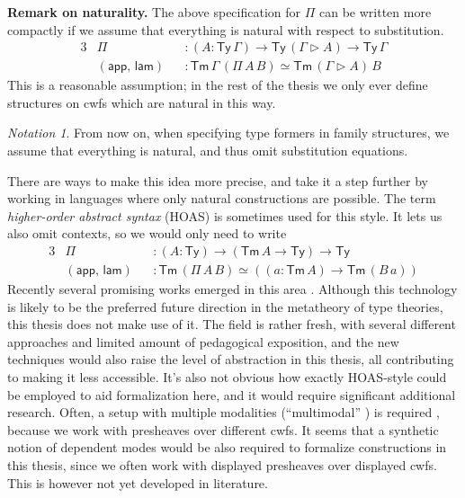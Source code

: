 \documentclass[12pt,a4paper,twoside,openany]{book}
\theoremstyle{remark}
\newtheorem{notation}{Notation}
\theoremstyle{definition}
\theoremstyle{theorem}
\newcommand{\ms}[1]{\mathsf{#1}}
\newcommand{\Tm}{\mathsf{Tm}}
\newcommand{\Ty}{\mathsf{Ty}}
\newcommand{\ext}{\triangleright}
\newcommand{\app}{\ms{app}}
\newcommand{\lam}{\ms{lam}}
\begin{document}
\textbf{Remark on naturality.} The above specification for $\Pi$ can be written
more compactly if we assume that everything is natural with respect to
substitution.
\begin{alignat*}{3}
  &\Pi            &&: (A : \Ty\,\Gamma) \to \Ty\,(\Gamma\ext A) \to \Ty\,\Gamma\\
  & (\app,\,\lam) &&: \Tm\,\Gamma\,(\Pi\,A\,B) \simeq \Tm\,(\Gamma \ext A)\,B
\end{alignat*}
This is a reasonable assumption; in the rest of the thesis we only ever define
structures on cwfs which are natural in this way.

\begin{notation} From now on, when specifying type formers in family structures,
we assume that everything is natural, and thus omit substitution equations.
\end{notation}

There are ways to make this idea more precise, and take it a step further by
working in languages where only natural constructions are possible. The term
\emph{higher-order abstract syntax} (HOAS) is sometimes used for this style. It lets us
also omit contexts, so we would only need to write
\begin{alignat*}{3}
  &\Pi            &&: (A : \Ty) \to (\Tm\,A \to \Ty) \to \Ty\\
  & (\app,\,\lam) &&: \Tm\,(\Pi\,A\,B) \simeq ((a : \Tm\,A) \to \Tm\,(B\,a))
\end{alignat*}
Recently several promising works emerged in this area \cite{TODO}. Although this
technology is likely to be the preferred future direction in the metatheory of
type theories, this thesis does not make use of it. The field is rather fresh,
with several different approaches and limited amount of pedagogical exposition,
and the new techniques would also raise the level of abstraction in this thesis,
all contributing to making it less accessible. It's also not obvious how exactly
HOAS-style could be employed to aid formalization here, and it would require
significant additional research.  Often, a setup with multiple modalities
(``multimodal'' \cite{gratzer20multimodal}) is required
\cite{bocquet2021induction}, because we work with presheaves over different
cwfs. It seems that a synthetic notion of dependent modes would be also
required to formalize constructions in this thesis, since we often work with
displayed presheaves over displayed cwfs. This is however not yet developed in
literature.
\end{document}
